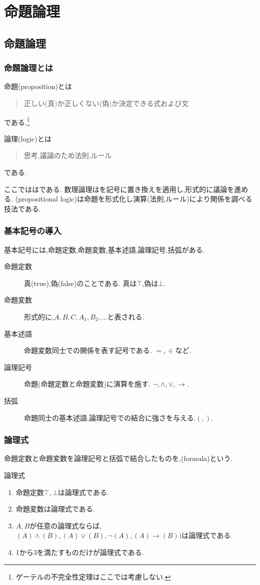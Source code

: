 \chapter{命題論理}
\section{命題論理}
\subsection{命題論理とは}
命題(proposition)とは
\begin{quotation}
 正しい(真)か正しくない(偽)か決定できる式および文
\end{quotation}
である.\footnote{ゲーテルの不完全性定理はここでは考慮しない.}

論理(logic)とは
\begin{quotation}
 思考,議論のため法則,ルール
\end{quotation}
である.

ここでははである.
数理論理はを記号に置き換えを適用し,形式的に議論を進める.
(propositional logic)は命題を形式化し演算(法則,ルール)により関係を調べる技法である.

\subsection{基本記号の導入}
基本記号には,命題定数,命題変数,基本述語,論理記号,括弧がある.
\begin{description}
 \item[命題定数] 真(true),偽(false)のことである. 真は$\top$,偽は$\bot$.
 \item[命題変数] 形式的に,$A,B,C,A_1,B_2,...$と表される.
 \item[基本述語] 命題変数同士での関係を表す記号である. $=,\in$など.
 \item[論理記号] 命題(命題定数と命題変数)に演算を施す. $\lnot,\land,\lor,\to$.
 \item[括弧] 命題同士の基本述語,論理記号での結合に強さを与える.$(,)$.
\end{description}

\subsection{論理式}
命題定数と命題変数を論理記号と括弧で結合したものを,(formula)という.
\begin{dfn}
 論理式
 \begin{enumerate}
  \item 命題定数$\top,\bot$は論理式である.
  \item 命題変数は論理式である.
  \item $A,B$が任意の論理式ならば,$(A) \land (B),(A) \lor (B), \lnot (A), (A) \to (B))$は論理式である.
  \item 1から3を満たすものだけが論理式である.
 \end{enumerate}
\end{dfn}

